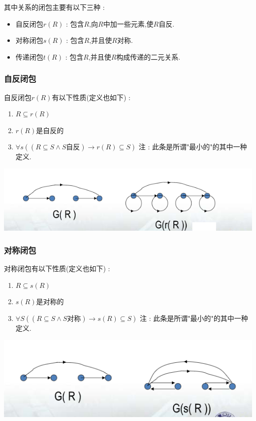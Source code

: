 {{{  其中关系的闭包主要有以下三种 :

  \begin{itemize}
    \item 自反闭包$r(R)$ : 包含$R$,向$R$中加一些元素,使$R$自反.
    \item 对称闭包$s(R)$ : 包含$R$,并且使$R$对称.
    \item 传递闭包$t(R)$ : 包含$R$,并且使$R$构成传递的二元关系.
  \end{itemize}
}%

\subsubsection{自反闭包}{
  自反闭包$r(R)$有以下性质(定义也如下) : \begin{enumerate}
    \item $R \subseteq r(R)$
    \item $r(R)$是自反的
    \item $\forall s ((R \subseteq S \land S\mbox{自反}) \to r(R) \subseteq S)$ 注 : 此条是所谓"最小的"的其中一种定义.
  \end{enumerate}

  \begin{center}
    \includegraphics{resources/Reflexive_closure.png}
  \end{center}
}%

\subsubsection{对称闭包}{
  对称闭包有以下性质(定义也如下) : \begin{enumerate}
    \item $R \subseteq s(R)$
    \item $s(R)$是对称的
    \item $\forall S ((R \subseteq S \land S\mbox{对称}) \to s(R) \subseteq S)$ 注 : 此条是所谓"最小的"的其中一种定义.
  \end{enumerate}

  \begin{center}
    \includegraphics{resources/Symmetric_closure.png}
  \end{center}
}%

}}
